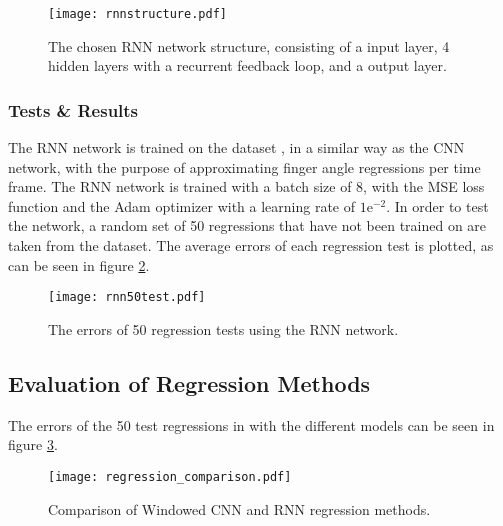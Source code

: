 \documentclass[../main.tex]{subfiles}
\begin{document}
\begin{figure}[H]
\begin{center}
\texttt{[image: rnnstructure.pdf]}
\caption{The chosen RNN network structure, consisting of a input layer, 4 hidden layers with a recurrent feedback loop, and a output layer.}
\label{fig:rnn_structure}
\end{center}
\end{figure}

\subsubsection{Tests \& Results}

The RNN network is trained on the dataset \cite{kinmusdataset}, in a similar way as the CNN network, with the purpose of approximating finger angle regressions per time frame.
The RNN network is trained with a batch size of 8, with the  MSE loss function and the Adam optimizer with a learning rate of $1\text{e}^{-2}$.
In order to test the network, a random set of 50 regressions that have not been trained on are taken from the dataset.
The average errors of each regression test is plotted, as can be seen in figure \ref{fig:rnntest}.

\begin{figure}[H]
\begin{center}
\texttt{[image: rnn50test.pdf]}
\caption{The errors of 50 regression tests using the RNN network.}
\label{fig:rnntest}
\end{center}
\end{figure}

\newpage
\subsection{Evaluation of Regression Methods}

The errors of the 50 test regressions in with the different models can be seen in figure \ref{fig:regression_comp}.

\begin{figure}[h]
\begin{center}
\texttt{[image: regression\_comparison.pdf]}
\caption{Comparison of Windowed CNN and RNN regression methods.}
\label{fig:regression_comp}
\end{center}
\end{figure}
\end{document}
